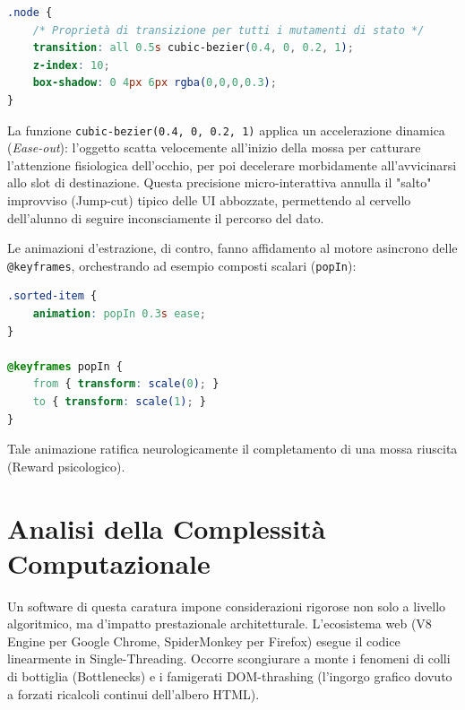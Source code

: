 \documentclass[openany]{theme/uniprthesis}
\begin{document}
\begin{lstlisting}[language=CSS, breaklines=true, basicstyle=\footnotesize\ttfamily, frame=single, caption={Transizione fluida interpolata su curva di Bézier}, keywordstyle=\color{blue}]
.node {
    /* Proprietà di transizione per tutti i mutamenti di stato */
    transition: all 0.5s cubic-bezier(0.4, 0, 0.2, 1);
    z-index: 10;
    box-shadow: 0 4px 6px rgba(0,0,0,0.3);
}
\end{lstlisting}

La funzione \texttt{cubic-bezier(0.4, 0, 0.2, 1)} applica un accelerazione dinamica (\textit{Ease-out}): l'oggetto scatta velocemente all'inizio della mossa per catturare l'attenzione fisiologica dell'occhio, per poi decelerare morbidamente all'avvicinarsi allo slot di destinazione. Questa precisione micro-interattiva annulla il "salto" improvviso (Jump-cut) tipico delle UI abbozzate, permettendo al cervello dell'alunno di seguire inconsciamente il percorso del dato.

Le animazioni d'estrazione, di contro, fanno affidamento al motore asincrono delle \texttt{@keyframes}, orchestrando ad esempio composti scalari (\texttt{popIn}):
\begin{lstlisting}[language=CSS, breaklines=true, basicstyle=\footnotesize\ttfamily, frame=single, caption={Animazione Pop-In per i nodi ordinati}, keywordstyle=\color{blue}]
.sorted-item {
    animation: popIn 0.3s ease;
}

@keyframes popIn {
    from { transform: scale(0); }
    to { transform: scale(1); }
}
\end{lstlisting}
Tale animazione ratifica neurologicamente il completamento di una mossa riuscita (Reward psicologico).

\section{Analisi della Complessità Computazionale}
Un software di questa caratura impone considerazioni rigorose non solo a livello algoritmico, ma d'impatto prestazionale architetturale. L'ecosistema web (V8 Engine per Google Chrome, SpiderMonkey per Firefox) esegue il codice linearmente in Single-Threading. Occorre scongiurare a monte i fenomeni di colli di bottiglia (Bottlenecks) e i famigerati DOM-thrashing (l'ingorgo grafico dovuto a forzati ricalcoli continui dell'albero HTML).
\end{document}
